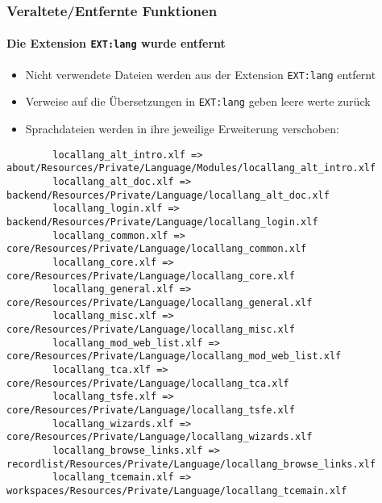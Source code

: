 
\begin{frame}[fragile]
	\frametitle{Veraltete/Entfernte Funktionen}
	\framesubtitle{Die Extension \texttt{EXT:lang} wurde entfernt}

	\lstset{basicstyle=\tiny\ttfamily}

	\begin{itemize}
		\item Nicht verwendete Dateien werden aus der Extension \texttt{EXT:lang} entfernt
		\item Verweise auf die Übersetzungen in \texttt{EXT:lang} geben leere werte zurück
		\item Sprachdateien werden in ihre jeweilige Erweiterung verschoben:
	\end{itemize}

	\begin{lstlisting}
		locallang_alt_intro.xlf => about/Resources/Private/Language/Modules/locallang_alt_intro.xlf
		locallang_alt_doc.xlf => backend/Resources/Private/Language/locallang_alt_doc.xlf
		locallang_login.xlf => backend/Resources/Private/Language/locallang_login.xlf
		locallang_common.xlf => core/Resources/Private/Language/locallang_common.xlf
		locallang_core.xlf => core/Resources/Private/Language/locallang_core.xlf
		locallang_general.xlf => core/Resources/Private/Language/locallang_general.xlf
		locallang_misc.xlf => core/Resources/Private/Language/locallang_misc.xlf
		locallang_mod_web_list.xlf => core/Resources/Private/Language/locallang_mod_web_list.xlf
		locallang_tca.xlf => core/Resources/Private/Language/locallang_tca.xlf
		locallang_tsfe.xlf => core/Resources/Private/Language/locallang_tsfe.xlf
		locallang_wizards.xlf => core/Resources/Private/Language/locallang_wizards.xlf
		locallang_browse_links.xlf => recordlist/Resources/Private/Language/locallang_browse_links.xlf
		locallang_tcemain.xlf => workspaces/Resources/Private/Language/locallang_tcemain.xlf
	\end{lstlisting}

\end{frame}

